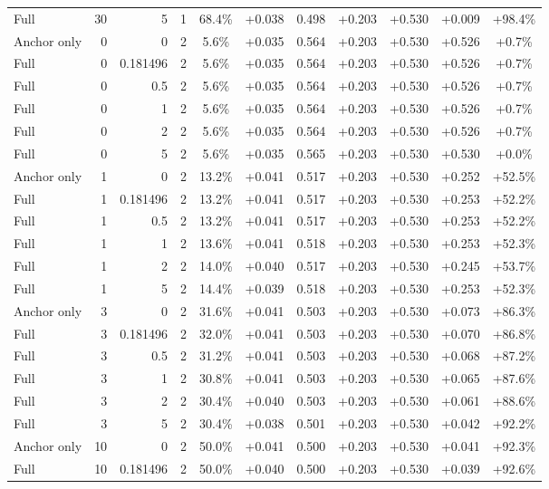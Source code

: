 \begin{table}[htbp]
\begin{tabular}{lrrrccccccc}
Full & 30 & 5 & 1 & 68.4\% & +0.038 & 0.498 & +0.203 & +0.530 & +0.009 & +98.4\% \\
Anchor only & 0 & 0 & 2 & 5.6\% & +0.035 & 0.564 & +0.203 & +0.530 & +0.526 & +0.7\% \\
Full & 0 & 0.181496 & 2 & 5.6\% & +0.035 & 0.564 & +0.203 & +0.530 & +0.526 & +0.7\% \\
Full & 0 & 0.5 & 2 & 5.6\% & +0.035 & 0.564 & +0.203 & +0.530 & +0.526 & +0.7\% \\
Full & 0 & 1 & 2 & 5.6\% & +0.035 & 0.564 & +0.203 & +0.530 & +0.526 & +0.7\% \\
Full & 0 & 2 & 2 & 5.6\% & +0.035 & 0.564 & +0.203 & +0.530 & +0.526 & +0.7\% \\
Full & 0 & 5 & 2 & 5.6\% & +0.035 & 0.565 & +0.203 & +0.530 & +0.530 & +0.0\% \\
Anchor only & 1 & 0 & 2 & 13.2\% & +0.041 & 0.517 & +0.203 & +0.530 & +0.252 & +52.5\% \\
Full & 1 & 0.181496 & 2 & 13.2\% & +0.041 & 0.517 & +0.203 & +0.530 & +0.253 & +52.2\% \\
Full & 1 & 0.5 & 2 & 13.2\% & +0.041 & 0.517 & +0.203 & +0.530 & +0.253 & +52.2\% \\
Full & 1 & 1 & 2 & 13.6\% & +0.041 & 0.518 & +0.203 & +0.530 & +0.253 & +52.3\% \\
Full & 1 & 2 & 2 & 14.0\% & +0.040 & 0.517 & +0.203 & +0.530 & +0.245 & +53.7\% \\
Full & 1 & 5 & 2 & 14.4\% & +0.039 & 0.518 & +0.203 & +0.530 & +0.253 & +52.3\% \\
Anchor only & 3 & 0 & 2 & 31.6\% & +0.041 & 0.503 & +0.203 & +0.530 & +0.073 & +86.3\% \\
Full & 3 & 0.181496 & 2 & 32.0\% & +0.041 & 0.503 & +0.203 & +0.530 & +0.070 & +86.8\% \\
Full & 3 & 0.5 & 2 & 31.2\% & +0.041 & 0.503 & +0.203 & +0.530 & +0.068 & +87.2\% \\
Full & 3 & 1 & 2 & 30.8\% & +0.041 & 0.503 & +0.203 & +0.530 & +0.065 & +87.6\% \\
Full & 3 & 2 & 2 & 30.4\% & +0.040 & 0.503 & +0.203 & +0.530 & +0.061 & +88.6\% \\
Full & 3 & 5 & 2 & 30.4\% & +0.038 & 0.501 & +0.203 & +0.530 & +0.042 & +92.2\% \\
Anchor only & 10 & 0 & 2 & 50.0\% & +0.041 & 0.500 & +0.203 & +0.530 & +0.041 & +92.3\% \\
Full & 10 & 0.181496 & 2 & 50.0\% & +0.040 & 0.500 & +0.203 & +0.530 & +0.039 & +92.6\% \\

\end{tabular}
\end{table}

